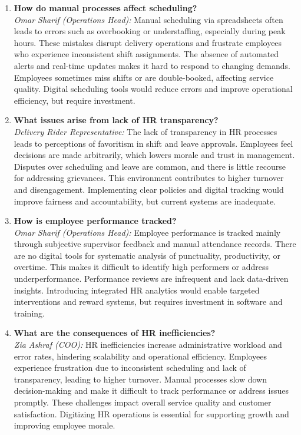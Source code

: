 \documentclass[12pt,a4paper]{article}
\begin{document}
\begin{enumerate}
        \item \textbf{How do manual processes affect scheduling?} \\
        \textit{Omar Sharif (Operations Head):} Manual scheduling via spreadsheets often leads to errors such as overbooking or understaffing, especially during peak hours. These mistakes disrupt delivery operations and frustrate employees who experience inconsistent shift assignments. The absence of automated alerts and real-time updates makes it hard to respond to changing demands. Employees sometimes miss shifts or are double-booked, affecting service quality. Digital scheduling tools would reduce errors and improve operational efficiency, but require investment.

        \item \textbf{What issues arise from lack of HR transparency?} \\
        \textit{Delivery Rider Representative:} The lack of transparency in HR processes leads to perceptions of favoritism in shift and leave approvals. Employees feel decisions are made arbitrarily, which lowers morale and trust in management. Disputes over scheduling and leave are common, and there is little recourse for addressing grievances. This environment contributes to higher turnover and disengagement. Implementing clear policies and digital tracking would improve fairness and accountability, but current systems are inadequate.

        \item \textbf{How is employee performance tracked?} \\
        \textit{Omar Sharif (Operations Head):} Employee performance is tracked mainly through subjective supervisor feedback and manual attendance records. There are no digital tools for systematic analysis of punctuality, productivity, or overtime. This makes it difficult to identify high performers or address underperformance. Performance reviews are infrequent and lack data-driven insights. Introducing integrated HR analytics would enable targeted interventions and reward systems, but requires investment in software and training.

        \item \textbf{What are the consequences of HR inefficiencies?} \\
        \textit{Zia Ashraf (COO):} HR inefficiencies increase administrative workload and error rates, hindering scalability and operational efficiency. Employees experience frustration due to inconsistent scheduling and lack of transparency, leading to higher turnover. Manual processes slow down decision-making and make it difficult to track performance or address issues promptly. These challenges impact overall service quality and customer satisfaction. Digitizing HR operations is essential for supporting growth and improving employee morale.


\end{enumerate}
\end{document}
